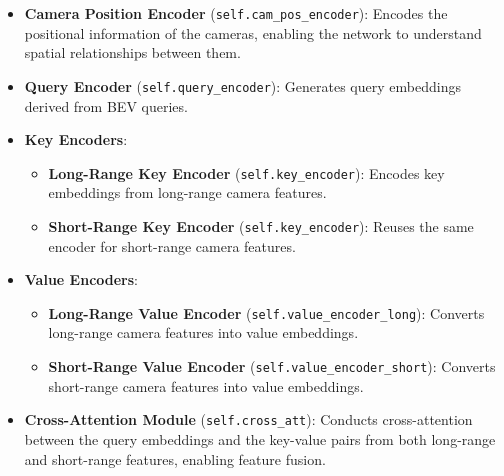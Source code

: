 \begin{itemize}
    \item \textbf{Camera Position Encoder} (\texttt{self.cam\_pos\_encoder}): Encodes the positional information of the cameras, enabling the network to understand spatial relationships between them.
    \item \textbf{Query Encoder} (\texttt{self.query\_encoder}): Generates query embeddings derived from BEV queries.
    \item \textbf{Key Encoders}:
    \begin{itemize}
        \item \textbf{Long-Range Key Encoder} (\texttt{self.key\_encoder}): Encodes key embeddings from long-range camera features.
        \item \textbf{Short-Range Key Encoder} (\texttt{self.key\_encoder}): Reuses the same encoder for short-range camera features.
    \end{itemize}
    \item \textbf{Value Encoders}:
    \begin{itemize}
        \item \textbf{Long-Range Value Encoder} (\texttt{self.value\_encoder\_long}): Converts long-range camera features into value embeddings.
        \item \textbf{Short-Range Value Encoder} (\texttt{self.value\_encoder\_short}): Converts short-range camera features into value embeddings.
    \end{itemize}
    \item \textbf{Cross-Attention Module} (\texttt{self.cross\_att}): Conducts cross-attention between the query embeddings and the key-value pairs from both long-range and short-range features, enabling feature fusion.
\end{itemize}

